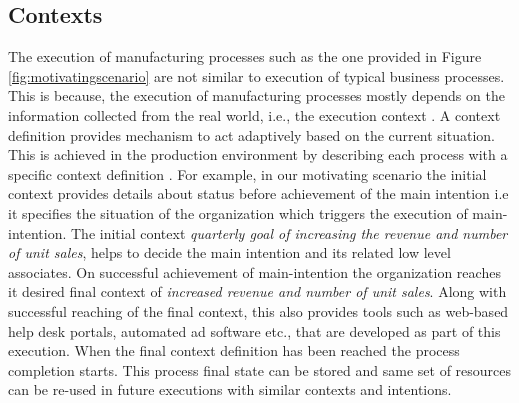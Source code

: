 \subsection{Contexts} 
\label{sec:contexts}
The execution of manufacturing processes such as the one provided in Figure \ref{fig:motivatingscenario} are not similar to execution of typical business processes. This is because, the execution of manufacturing processes mostly depends on the information collected from the real world, i.e., the execution context \cite{Sungur2016}. A context definition provides mechanism to act adaptively based on the current situation. This is achieved in the production environment by describing each process with a specific context definition \cite{Sungur2016}. For example, in our motivating scenario the initial context provides details about status before achievement of the main intention i.e it specifies the situation of the organization which triggers the execution of main-intention. The initial context \textit{quarterly goal of increasing the revenue and number of unit sales}, helps to decide the main intention and its related low level associates. On successful achievement of main-intention the organization reaches it desired final context of \textit{increased revenue and number of unit sales}. Along with successful reaching of the final context, this also provides tools such as web-based help desk portals, automated ad software etc., that are developed as part of this execution. When the final context definition has been reached the process completion starts. This process final state can be stored \cite{Sungur2015b} and same set of resources can be re-used in future executions with similar contexts and intentions.
 
